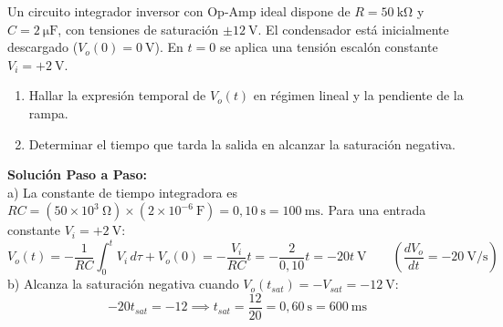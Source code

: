 \begin{ejercicio}
Un circuito integrador inversor con Op-Amp ideal dispone de $R = 50\ \si{\kilo\ohm}$ y $C = 2\ \si{\micro\farad}$, con tensiones de saturación $\pm 12\ \si{\volt}$. El condensador está inicialmente descargado ($V_o(0) = 0\ \si{\volt}$). En $t = 0$ se aplica una tensión escalón constante $V_i = +2\ \si{\volt}$.
\begin{enumerate}[label=\alph*)]
    \item Hallar la expresión temporal de $V_o(t)$ en régimen lineal y la pendiente de la rampa.
    \item Determinar el tiempo que tarda la salida en alcanzar la saturación negativa.
\end{enumerate}
\tcbline
\textbf{Solución Paso a Paso:}\\[4pt]
a) La constante de tiempo integradora es $R C = (50 \times 10^3\ \si{\ohm}) \times (2 \times 10^{-6}\ \si{\farad}) = 0{,}10\ \si{\second} = 100\ \si{\milli\second}$.
Para una entrada constante $V_i = +2\ \si{\volt}$:
\begin{equation}
    V_o(t) = -\frac{1}{R C} \int_0^t V_i\, d\tau + V_o(0) = -\frac{V_i}{R C} t = -\frac{2}{0{,}10} t = -20 t\ \si{\volt} \qquad \left(\frac{dV_o}{dt} = -20\ \si{\volt\per\second}\right)
\end{equation}
b) Alcanza la saturación negativa cuando $V_o(t_{sat}) = -V_{sat} = -12\ \si{\volt}$:
\begin{equation}
    -20 t_{sat} = -12 \implies \boxed{t_{sat} = \frac{12}{20} = 0{,}60\ \si{\second} = 600\ \si{\milli\second}}
\end{equation}
\end{ejercicio}
